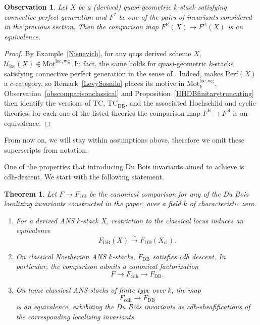 \documentclass{amsart}
\theoremstyle{plain}
\newtheorem{theorem}[prop]{Theorem}
\newtheorem{obs}[prop]{Observation}
\theoremstyle{definition}
\newcommand{\ra}{\rightarrow}
\newcommand{\Perf}{\mathrm{Perf}}
\newcommand{\Motlocwg}{\mathrm{Mot}^{\mathrm{loc},\mathrm{wg}}}
\newcommand{\Uloc}{\mathcal U_{\mathrm{loc}}}
\newcommand{\TC}{\mathrm{TC}}
\newcommand{\DB}{\mathrm{DB}}
\newcommand{\cl}{\mathrm{cl}}
\newcommand{\cdh}{\mathrm{cdh}}
\begin{document}
\begin{obs}
Let $X$ be a (derived) quasi-geometric $k$-stack satisfying connective perfect generation and $F^?$ be one of the pairs of invariants considered in the previous section. Then the comparison map $F^{\mathrm{E}}(X) \ra F^{\cl}(X)$ is an equivalence.
\end{obs}

\begin{proof}

By Example~\ref{Nisnevich}, for any qcqs derived scheme $X$, $\Uloc(X)\in \Motlocwg$. In fact, the same holds for quasi-geometric $k$-stacks satisfying connective perfect generation in the sense of
\cite[Definition 6.21]{LS25}. Indeed,
\cite[Theorem 6.28]{LS25} makes $\Perf(X)$ a $c$-category, so Remark~\ref{LevySosnilo} places its motive in $\Motlocwg_k$.
Observation~\ref{obscomparisonclassical} and Proposition~\ref{HHDBfinitarytruncating} then identify the versions of $\TC$, $\TC_{\DB}$, and the associated Hochschild and cyclic theories: for each one of the listed theories the comparison map $F^{\mathrm{E}} \ra F^{\cl}$ is an equivalence.    
\end{proof}
From now on, we will stay within assumptions above, therefore we omit these superscripts from notation.



\medskip

One of the properties that introducing Du Bois invariants aimed to achieve is cdh-descent. We start with the following statement.

\begin{theorem}\label{DBstacksdescent}
Let $F\ra F_{\DB}$ be the canonical comparison for any of the Du Bois localizing invariants constructed in the paper, over a field $k$ of characteristic zero.
\begin{enumerate}
\item
For a derived ANS $k$-stack $X$, restriction to the classical locus induces an equivalence
\[
F_{\DB}(X)\xrightarrow{\sim}F_{\DB}(X_{\cl}).
\]

\item
On classical Noetherian ANS $k$-stacks, $F_{\DB}$
satisfies cdh descent. In particular, the comparison admits a canonical factorization
\[
F\longrightarrow F_{\cdh}\longrightarrow F_{\DB}.
\]

\item
On tame classical ANS stacks of finite type over $k$, the map
\[
F_{\cdh}\longrightarrow F_{\DB}
\]
is an equivalence, exhibiting the Du Bois invariants as cdh-sheafifications of the corresponding localizing invariants.
\end{enumerate}
\end{theorem}
\end{document}
